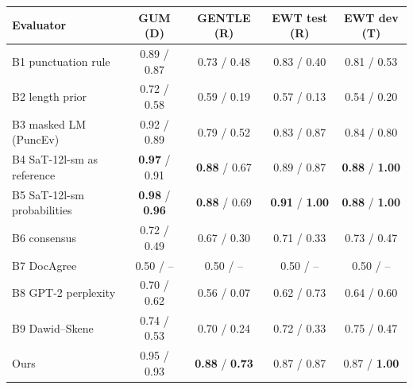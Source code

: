\begin{tabular}{lcccc}
\toprule
Evaluator & GUM (D) & GENTLE (R) & EWT test (R) & EWT dev (T) \\
\midrule
B1 punctuation rule & 0.89 / 0.87 & 0.73 / 0.48 & 0.83 / 0.40 & 0.81 / 0.53 \\
B2 length prior & 0.72 / 0.58 & 0.59 / 0.19 & 0.57 / 0.13 & 0.54 / 0.20 \\
B3 masked LM (PuncEv) & 0.92 / 0.89 & 0.79 / 0.52 & 0.83 / 0.87 & 0.84 / 0.80 \\
B4 SaT-12l-sm as reference & \textbf{0.97} / 0.91 & \textbf{0.88} / 0.67 & 0.89 / 0.87 & \textbf{0.88} / \textbf{1.00} \\
B5 SaT-12l-sm probabilities & \textbf{0.98} / \textbf{0.96} & \textbf{0.88} / 0.69 & \textbf{0.91} / \textbf{1.00} & \textbf{0.88} / \textbf{1.00} \\
B6 consensus & 0.72 / 0.49 & 0.67 / 0.30 & 0.71 / 0.33 & 0.73 / 0.47 \\
B7 DocAgree & 0.50 / -- & 0.50 / -- & 0.50 / -- & 0.50 / -- \\
B8 GPT-2 perplexity & 0.70 / 0.62 & 0.56 / 0.07 & 0.62 / 0.73 & 0.64 / 0.60 \\
B9 Dawid--Skene & 0.74 / 0.53 & 0.70 / 0.24 & 0.72 / 0.33 & 0.75 / 0.47 \\
Ours & 0.95 / 0.93 & \textbf{0.88} / \textbf{0.73} & 0.87 / 0.87 & 0.87 / \textbf{1.00} \\
\bottomrule
\end{tabular}
